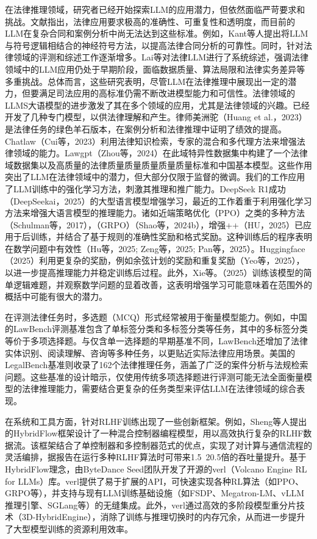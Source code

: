 \documentclass{pkuthesis}
\begin{document}
在法律推理领域，研究者已经开始探索LLM的应用潜力，但依然面临严苛要求和挑战。文献指出，法律应用要求极高的准确性、可重复性和透明度，而目前的LLM在复杂合同和案例分析中尚无法达到这些标准。例如，Kant等人提出将LLM与符号逻辑相结合的神经符号方法，以提高法律合同分析的可靠性。同时，针对法律领域的评测和综述工作逐渐增多。Lai等对法律LLM进行了系统综述，强调法律领域中的LLM应用仍处于早期阶段，面临数据质量、算法局限和法律实务差异等多重挑战。总体而言，这些研究表明，尽管LLM在法律推理中展现出一定的潜力，但要满足司法应用的高标准仍需不断改进模型能力和可信性。法律领域的LLMS大语模型的进步激发了其在多个领域的应用，尤其是法律领域的兴趣。已经开发了几种专门模型，以供法律理解和产生。律师美洲驼（Huang et al.，2023）是法律任务的绿色羊石版本，在案例分析和法律推理中证明了绩效的提高。Chatlaw（Cui等，2023）利用法律知识检索，专家的混合和多代理方法来增强法律领域的能力。Lawgpt（Zhou等，2024）在此域特异性数据集中构建了一个法律域数据集以及高质量的法律质量质量质量质量质量标准和中国基本模型。这些作用突出了LLM在法律领域中的潜力，但大部分仅限于监督的微调。我们的工作应用了LLM训练中的强化学习方法，刺激其推理和推广能力。DeepSeek R1成功（DeepSeekai，2025）的大型语言模型增强学习，最近的工作着重于利用强化学习方法来增强大语言模型的推理能力。诸如近端策略优化（PPO）之类的多种方法（Schulman等，2017），（GRPO）（Shao等，2024b），增强++（HU，2025）已应用于后训练，并结合了基于规则的准确性奖励和格式奖励。这种训练后的程序表明在数学问题中有效性（Hu等，2025; Zeng等，2025; Pan等，2025）。Huggingface（2025）利用更复杂的奖励，例如余弦计划的奖励和重复奖励（Yeo等，2025），以进一步提高推理能力并稳定训练后过程。此外，Xie等。（2025）训练该模型的简单逻辑难题，并观察数学问题的显着改善，这表明增强学习可能意味着在范围外的概括中可能有很大的潜力。

在评测法律任务时，多选题（MCQ）形式经常被用于衡量模型能力。例如，中国的LawBench评测基准包含了单标签分类和多标签分类等任务，其中的多标签分类等价于多项选择题。与仅含单一选择题的早期基准不同，LawBench还增加了法律实体识别、阅读理解、咨询等多种任务，以更贴近实际法律应用场景。美国的LegalBench基准则收录了162个法律推理任务，涵盖了广泛的案件分析与法规检索问题。这些基准的设计暗示，仅使用传统多项选择题进行评测可能无法全面衡量模型的法律推理能力，需要结合更复杂的任务类型来评估LLM在法律领域的综合表现。

在系统和工具方面，针对RLHF训练出现了一些创新框架。例如，Sheng等人提出的HybridFlow框架设计了一种混合控制器编程模型，用以高效执行复杂的RLHF数据流。该框架结合了单控制器和多控制器范式的优点，实现了对计算与通信流程的灵活编排，据报告在运行多种RLHF算法时可带来1.5~20.5倍的吞吐量提升。基于HybridFlow理念，由ByteDance Seed团队开发了开源的verl（Volcano Engine RL for LLMs）库。verl提供了易于扩展的API，可快速实现各种RL算法（如PPO、GRPO等），并支持与现有LLM训练基础设施（如FSDP、Megatron-LM、vLLM推理引擎、SGLang等）的无缝集成。此外，verl通过高效的多阶段模型重分片技术（3D-HybridEngine），消除了训练与推理切换时的内存冗余，从而进一步提升了大型模型训练的资源利用效率。
\end{document}
